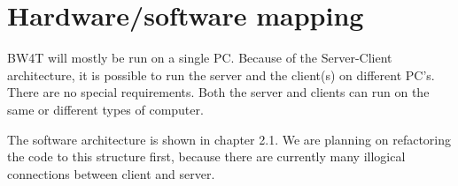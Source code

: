\section{Hardware/software mapping}
BW4T will mostly be run on a single PC. Because of the Server-Client architecture, it is possible to run the server and the client(s) on different PC's. There are no special requirements. Both the server and clients can run on the same or different types of computer. 

The software architecture is shown in chapter 2.1. We are planning on refactoring the code to this structure first, because there are currently many illogical connections between client and server.